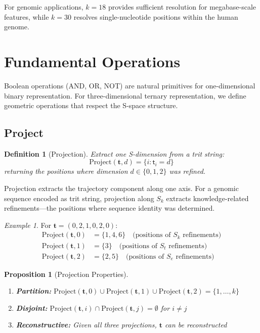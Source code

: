 \documentclass[twocolumn,10pt]{article}
\newtheorem{definition}[theorem]{Definition}
\newtheorem{proposition}[theorem]{Proposition}
\theoremstyle{remark}
\newtheorem{example}[theorem]{Example}
\newcommand{\Sk}{S_k}
\newcommand{\St}{S_t}
\newcommand{\Se}{S_e}
\newcommand{\tmark}{\mathsf{t}}
\begin{document}
For genomic applications, $k = 18$ provides sufficient resolution for megabase-scale features, while $k = 30$ resolves single-nucleotide positions within the human genome.

\section{Fundamental Operations}

Boolean operations (AND, OR, NOT) are natural primitives for one-dimensional binary representation. For three-dimensional ternary representation, we define geometric operations that respect the S-space structure.

\subsection{Project}

\begin{definition}[Projection]
Extract one S-dimension from a trit string:
\begin{equation}
\text{Project}(\mathbf{t}, d) = \{i : \tmark_i = d\}
\end{equation}
returning the positions where dimension $d \in \{0,1,2\}$ was refined.
\end{definition}

Projection extracts the trajectory component along one axis. For a genomic sequence encoded as trit string, projection along $\Sk$ extracts knowledge-related refinements---the positions where sequence identity was determined.

\begin{example}
For $\mathbf{t} = (0, 2, 1, 0, 2, 0)$:
\begin{align}
\text{Project}(\mathbf{t}, 0) &= \{1, 4, 6\} \quad \text{(positions of } \Sk \text{ refinements)} \\
\text{Project}(\mathbf{t}, 1) &= \{3\} \quad \text{(positions of } \St \text{ refinements)} \\
\text{Project}(\mathbf{t}, 2) &= \{2, 5\} \quad \text{(positions of } \Se \text{ refinements)}
\end{align}
\end{example}

\begin{proposition}[Projection Properties]
\begin{enumerate}
\item \textbf{Partition:} $\text{Project}(\mathbf{t}, 0) \cup \text{Project}(\mathbf{t}, 1) \cup \text{Project}(\mathbf{t}, 2) = \{1, \ldots, k\}$
\item \textbf{Disjoint:} $\text{Project}(\mathbf{t}, i) \cap \text{Project}(\mathbf{t}, j) = \emptyset$ for $i \neq j$
\item \textbf{Reconstructive:} Given all three projections, $\mathbf{t}$ can be reconstructed
\end{enumerate}
\end{proposition}
\end{document}
